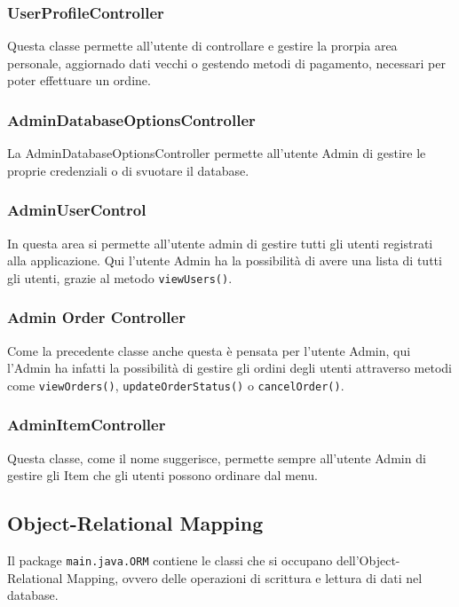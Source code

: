 \documentclass{article}
\begin{document}
\subsubsection{UserProfileController}
Questa classe permette all'utente di controllare e gestire la prorpia area personale, aggiornado dati vecchi o gestendo metodi di pagamento, necessari per poter effettuare un ordine.

\subsubsection{AdminDatabaseOptionsController}
La AdminDatabaseOptionsController permette all'utente Admin di gestire le proprie credenziali o di svuotare il database.

\subsubsection{AdminUserControl}
In questa area si permette all'utente admin di gestire tutti gli utenti registrati alla applicazione. Qui l'utente Admin ha la possibilità di avere una lista di tutti gli utenti, grazie al metodo \texttt{viewUsers()}.

\subsubsection{Admin Order Controller}
Come la precedente classe anche questa è pensata per l'utente Admin, qui l'Admin ha infatti la possibilità di gestire gli ordini degli utenti attraverso metodi come \texttt{viewOrders()}, \texttt{updateOrderStatus()} o \texttt{cancelOrder()}.

\subsubsection{AdminItemController}
Questa classe, come il nome suggerisce, permette sempre all'utente Admin di gestire gli Item che gli utenti possono ordinare dal menu.




\newpage


\subsection{Object-Relational Mapping}
Il package \texttt{main.java.ORM} contiene le classi che si occupano dell'Object-Relational Mapping, ovvero delle operazioni di scrittura e lettura di dati nel database.
\end{document}
